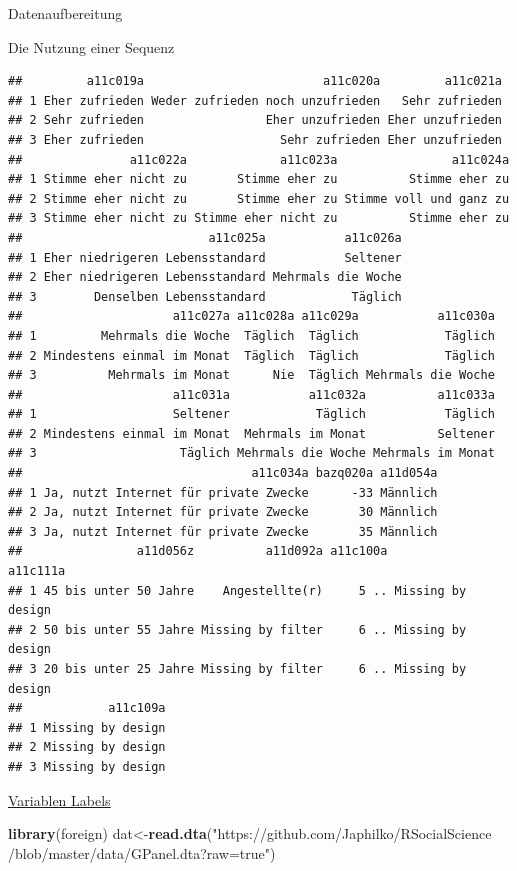 \documentclass[ignorenonframetext,]{beamer}
\newenvironment{Shaded}{}{}
\newcommand{\KeywordTok}[1]{\textcolor[rgb]{0.00,0.44,0.13}{\textbf{{#1}}}}
\newcommand{\StringTok}[1]{\textcolor[rgb]{0.25,0.44,0.63}{{#1}}}
\newcommand{\NormalTok}[1]{{#1}}
\begin{document}
\begin{frame}[fragile]{Datenaufbereitung}
\begin{block}{Die Nutzung einer Sequenz}
\begin{verbatim}
##         a11c019a                         a11c020a         a11c021a
## 1 Eher zufrieden Weder zufrieden noch unzufrieden   Sehr zufrieden
## 2 Sehr zufrieden                 Eher unzufrieden Eher unzufrieden
## 3 Eher zufrieden                   Sehr zufrieden Eher unzufrieden
##               a11c022a             a11c023a                a11c024a
## 1 Stimme eher nicht zu       Stimme eher zu          Stimme eher zu
## 2 Stimme eher nicht zu       Stimme eher zu Stimme voll und ganz zu
## 3 Stimme eher nicht zu Stimme eher nicht zu          Stimme eher zu
##                          a11c025a           a11c026a
## 1 Eher niedrigeren Lebensstandard           Seltener
## 2 Eher niedrigeren Lebensstandard Mehrmals die Woche
## 3        Denselben Lebensstandard            Täglich
##                     a11c027a a11c028a a11c029a           a11c030a
## 1         Mehrmals die Woche  Täglich  Täglich            Täglich
## 2 Mindestens einmal im Monat  Täglich  Täglich            Täglich
## 3          Mehrmals im Monat      Nie  Täglich Mehrmals die Woche
##                     a11c031a           a11c032a          a11c033a
## 1                   Seltener            Täglich           Täglich
## 2 Mindestens einmal im Monat  Mehrmals im Monat          Seltener
## 3                    Täglich Mehrmals die Woche Mehrmals im Monat
##                                a11c034a bazq020a a11d054a
## 1 Ja, nutzt Internet für private Zwecke      -33 Männlich
## 2 Ja, nutzt Internet für private Zwecke       30 Männlich
## 3 Ja, nutzt Internet für private Zwecke       35 Männlich
##                a11d056z          a11d092a a11c100a          a11c111a
## 1 45 bis unter 50 Jahre    Angestellte(r)     5 .. Missing by design
## 2 50 bis unter 55 Jahre Missing by filter     6 .. Missing by design
## 3 20 bis unter 25 Jahre Missing by filter     6 .. Missing by design
##            a11c109a
## 1 Missing by design
## 2 Missing by design
## 3 Missing by design
\end{verbatim}

\end{block}

\begin{block}{\href{https://stackoverflow.com/questions/2151147/using-stata-variable-labels-in-r}{Variablen
Labels}}

\begin{Shaded}
\begin{Highlighting}[]
\KeywordTok{library}\NormalTok{(foreign)}
\NormalTok{dat<-}\KeywordTok{read.dta}\NormalTok{(}\StringTok{"https://github.com/Japhilko/RSocialScience}
\StringTok{              /blob/master/data/GPanel.dta?raw=true"}\NormalTok{)}
\end{Highlighting}
\end{Shaded}


\end{block}
\end{frame}
\end{document}

